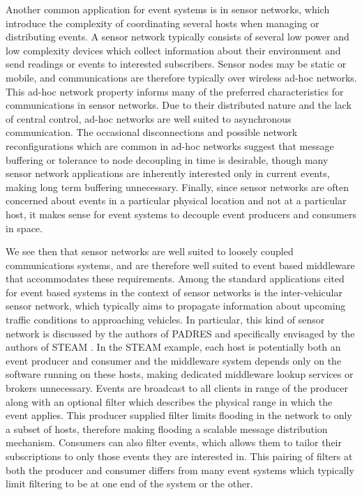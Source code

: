 \documentclass{acm_proc_article-sp}
\begin{document}
Another common application for event systems is in sensor networks, which introduce the complexity of coordinating several hosts when managing or distributing events. A sensor network typically consists of several low power and low complexity devices which collect information about their environment and send readings or events to interested subscribers. Sensor nodes may be static or mobile, and communications are therefore typically over wireless ad-hoc networks. This ad-hoc network property informs many of the preferred characteristics for communications in sensor networks. Due to their distributed nature and the lack of central control, ad-hoc networks are well suited to asynchronous communication. The occasional disconnections and possible network reconfigurations which are common in ad-hoc networks suggest that message buffering or tolerance to node decoupling in time is desirable, though many sensor network applications are inherently interested only in current events, making long term buffering unnecessary. Finally, since sensor networks are often concerned about events in a particular physical location and not at a particular host, it makes sense for event systems to decouple event producers and consumers in space. 

We see then that sensor networks are well suited to loosely coupled communications systems, and are therefore well suited to event based middleware that accommodates these requirements. Among the standard applications cited for event based systems in the context of sensor networks is the inter-vehicular sensor network, which typically aims to propagate information about upcoming traffic conditions to approaching vehicles. In particular, this kind of sensor network is discussed by the authors of PADRES \cite{Jacobsen:2010p8313} and specifically envisaged by the authors of STEAM \cite{Meier:2002p8380}. In the STEAM example, each host is potentially both an event producer and consumer and the middleware system depends only on the software running on these hosts, making dedicated middleware lookup services or brokers unnecessary. Events are broadcast to all clients in range of the producer along with an optional filter which describes the physical range in which the event applies. This producer supplied filter limits flooding in the network to only a subset of hosts, therefore making flooding a scalable message distribution mechanism. Consumers can also filter events, which allows them to tailor their subscriptions to only those events they are interested in. This pairing of filters at both the producer and consumer differs from many event systems which typically limit filtering to be at one end of the system or the other. 
\end{document}
